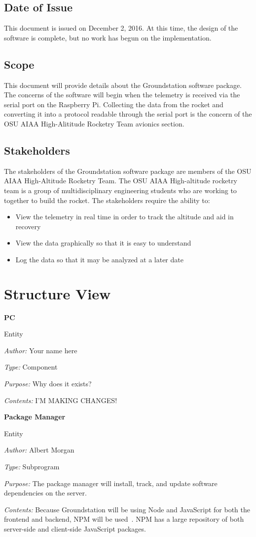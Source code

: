 \documentclass[10pt,draftclsnofoot,onecolumn]{IEEEtran}
\newcommand{\newentity}[5]{
	\begin{minipage}{\linewidth}
	\noindent\textbf{#2}
	
	\noindent Entity
	
	\noindent\textit{Author:} {#1}
		
	\noindent\textit{Type:} {#3}
	
	\noindent\textit{Purpose:} {#4}
	
	\noindent\textit{Contents:} {#5}
	\vspace{.5cm}
	\end{minipage}
}
\begin{document}
	\subsection{Date of Issue}
	This document is issued on December 2, 2016.
	At this time, the design of the software is complete, but no work has begun on the implementation.
	
	\subsection{Scope}
	This document will provide details about the Groundstation software package.
	The concerns of the software will begin when the telemetry is received via the serial port on the Raspberry Pi.
	Collecting the data from the rocket and converting it into a protocol readable through the serial port is the
	concern of the \ac{OSU} \ac{AIAA} High-Alititude Rocketry Team avionics section.
		
	\subsection{Stakeholders}
	The stakeholders of the Groundstation software package are members of the \ac{OSU} \ac{AIAA} High-Altitude Rocketry Team.
	The \ac{OSU} \ac{AIAA} High-altitude rocketry team is a group of multidisciplinary engineering students who are working to together to build the rocket.
	The stakeholders require the ability to:
	\begin{itemize}
		\item View the telemetry in real time in order to track the altitude and aid in recovery
		\item View the data graphically so that it is easy to understand
		\item Log the data so that it may be analyzed at a later date
	\end{itemize}

	\section{Structure View}
		
	
	
	

	\newentity
	{Your name here}
	{PC}
	{Component}
	{Why does it exists?}
	{I'M MAKING CHANGES!}

	\newentity
	{Albert Morgan}
	{Package Manager}
	{Subprogram}
	{
		The package manager will install, track, and update software dependencies on the server.
	}
	{
		Because Groundstation will be using Node and JavaScript for both the frontend and backend, \ac{NPM} will be used~\cite{npm}. \ac{NPM} has a large repository of both server-side and client-side JavaScript packages.
	}
	
\end{document}
